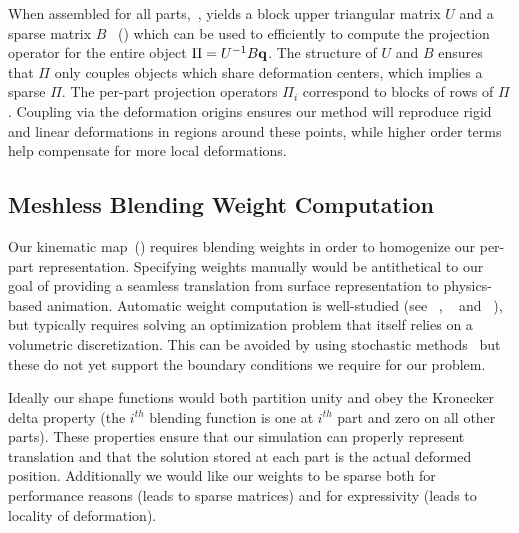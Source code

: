 When assembled for all parts,~, yields a block upper triangular matrix $U$ and a sparse matrix $B$ ~() which can be used to efficiently to compute the projection 
operator for the entire object $\Pi = U^{-1}B\mathbf{q}$. 
The structure of $U$ and $B$ ensures that $\Pi$ only couples objects which share deformation centers, which implies a sparse $\Pi$. 
The per-part projection operators $\Pi_i$ correspond to blocks of rows of $\Pi$. 
Coupling via the deformation origins ensures our method will reproduce rigid and linear deformations in regions around these points, while higher order 
terms help compensate for more local deformations.


\subsection{Meshless Blending Weight Computation}
\label{sec:weights}

Our kinematic map~() requires blending weights in order to homogenize our per-part representation. 
Specifying weights manually would be antithetical to our goal of providing a seamless translation from surface representation to physics-based animation.
Automatic  weight computation is well-studied (see ~\citet{10.1145/2766952}, ~\citet{BBW:2011} and ~\citet{10.1145/2010324.1964968}), but typically requires solving 
an optimization problem that itself relies on a volumetric discretization. 
This can be avoided by using stochastic methods~\cite{Sawhney:2020:MCG} but these do not yet support the boundary conditions we require for our problem. 

Ideally our shape functions would both partition unity and obey the Kronecker delta property (the $i^{th}$ blending function is one at $i^{th}$ part and zero on all other parts).
These properties ensure that our simulation can properly represent translation and that the solution stored at each part is the actual deformed position.
Additionally we would like our weights to be sparse both for performance reasons (leads to sparse matrices) and for expressivity (leads to locality of deformation). 

